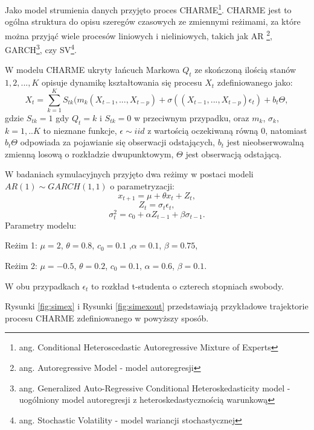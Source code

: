 \documentclass[man,mfu]{mgrwms}
\begin{document}
Jako model strumienia danych przyjęto proces CHARME\footnote{ang. Conditional Heteroscedastic Autoregressive Mixture of Experts}. CHARME jest to ogólna struktura do opisu szeregów czasowych ze zmiennymi reżimami, za które można przyjąć wiele procesów liniowych i nieliniowych, takich jak AR \footnote{ang. Autoregressive Model - model autoregresji}, GARCH\footnote{ang. Generalized Auto-Regressive Conditional Heteroskedasticity model - uogólniony model autoregresji z heteroskedastycznością warunkową}, czy  SV\footnote{ang. Stochastic Volatility - model wariancji stochastycznej}.

W modelu CHARME ukryty łańcuch Markowa ${Q_t}$ ze skończoną ilością stanów ${1,2,...,K}$ opisuje dynamikę kształtowania się procesu $X_t$ zdefiniowanego jako:
\begin{equation}
X_t = \sum^K_{k=1}S_{tk}(m_k(X_{t-1},...,X_{t-p})+\sigma ((X_{t-1},...,X_{t-p})\epsilon_t) + b_t\Theta,
\end{equation}
gdzie $S_{tk} = 1$ gdy $Q_t = k$ i $S_{tk} = 0$ w przeciwnym przypadku, oraz $m_k$, $\sigma_k$, $k = 1,..K$ to nieznane funkcje, $\epsilon \sim iid$ z wartością oczekiwaną równą 0, natomiast $b_t\Theta$ odpowiada za pojawianie się obserwacji odstających, $b_t$ jest nieobserwowalną zmienną losową o rozkładzie dwupunktowym, $\Theta$ jest obserwacją odstającą.

W badaniach symulacyjnych przyjęto dwa reżimy w postaci modeli $AR(1) \sim GARCH(1,1)$ o parametryzacji:
\begin{equation}
x_{t+1} = \mu + \theta x_{t} + Z_t,
\end{equation}
\begin{equation}
Z_t = \sigma_t \epsilon_t,
\end{equation}
\begin{equation}
\sigma_t^2 = c_0+ \alpha Z_{t-1} + \beta \sigma_{t-1}.
\end{equation}
Parametry modelu:
 
Reżim 1:
$\mu = 2$, $\theta = 0.8$, $c_0 = 0.1$ ,$\alpha = 0.1$, $\beta = 0.75$,

Reżim 2:
$\mu = -0.5$, $\theta = 0.2$, $c_0 = 0.1$, $\alpha = 0.6$, $\beta = 0.1$.

W obu przypadkach $\epsilon_t$ to rozkład t-studenta o czterech stopniach swobody. 

Rysunki \ref{fig:simex} i Rysunki \ref{fig:simexout} przedstawiają przykładowe trajektorie procesu CHARME zdefiniowanego w powyższy sposób.
\end{document}
